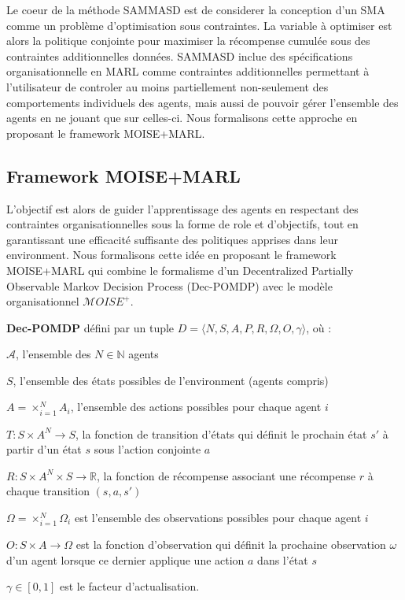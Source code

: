 \documentclass[sigconf,anonymous]{aamas}
\begin{document}
Le coeur de la méthode SAMMASD est de considerer la conception d'un SMA comme un problème d'optimisation sous contraintes. La variable à optimiser est alors la politique conjointe pour maximiser la récompense cumulée sous des contraintes additionnelles données. SAMMASD inclue des spécifications organisationnelle en MARL comme contraintes additionnelles permettant à l'utilisateur de controler au moins partiellement non-seulement des comportements individuels des agents, mais aussi de pouvoir gérer l'ensemble des agents en ne jouant que sur celles-ci. Nous formalisons cette approche en proposant le framework MOISE+MARL.

\subsection{\textbf{Framework MOISE+MARL}}

L'objectif est alors de guider l'apprentissage des agents en respectant des contraintes organisationnelles sous la forme de role et d'objectifs, tout en garantissant une efficacité suffisante des politiques apprises dans leur environment.
Nous formalisons cette idée en proposant le framework MOISE+MARL qui combine le formalisme d'un Decentralized Partially Observable Markov Decision Process (Dec-POMDP) avec le modèle organisationnel $\mathcal{M}OISE^+$.

\textbf{Dec-POMDP} \quad défini par un tuple $D = \langle N, S, A, P, R, \Omega, O, \gamma \rangle$, où :
%
\begin{itemize*}[label={},itemjoin={; }]
    \item $\mathcal{A}$, l'ensemble des $N \in \mathbb{N}$ agents
    \item $S$, l'ensemble des états possibles de l'environment (agents compris)
    \item $A = \times_{i=1}^N A_i $, l'ensemble des actions possibles pour chaque agent $i$
    \item $T: S \times A^N \to S$, la fonction de transition d'états qui définit le prochain état $s'$ à partir d'un état $s$ sous l'action conjointe $a$
    \item $R: S \times A^N \times  S \to \mathbb{R}$, la fonction de récompense associant une récompense $r$ à chaque transition $(s, a, s')$
    \item $\Omega = \times_{i=1}^N \Omega_i $ est l'ensemble des observations possibles pour chaque agent $i$
    \item $O: S \times A \to \Omega$ est la fonction d'observation qui définit la prochaine observation $\omega$ d'un agent lorsque ce dernier applique une action $a$ dans l'état $s$
    \item $\gamma \in [0, 1] $ est le facteur d'actualisation.
\end{itemize*}
\end{document}
